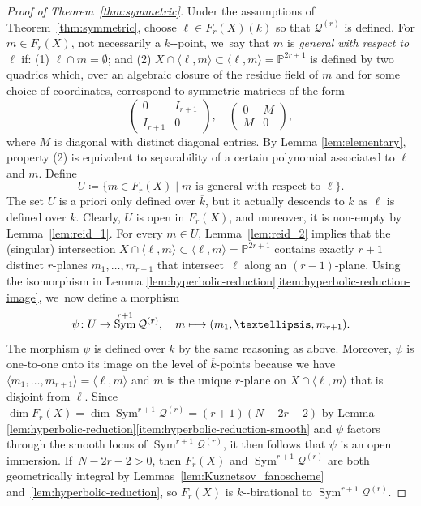 \documentclass[10pt,a4paper]{amsart}
\providecommand{\nobreakdash}{\nobreak\hbox{-}}
\newcommand\mto{\mathchoice{\longmapsto}{\mapsto}{\mapsto}{\mapsto}}
\let\bb\mathbb\let\Bbb\mathbb
\theoremstyle{plain}
\theoremstyle{definition}
\DeclareMathOperator{\Sym}{Sym}
\newcommand{\defi}[1]{\emph{#1}}
\newcommand{\kbar}{{\overline{k}}}
\renewcommand\P{\mathbb{P}}
\begin{document}
\begin{proof}[Proof of Theorem~\ref{thm:symmetric}]
Under the assumptions of Theorem~\ref{thm:symmetric}, choose $\ell\in F_r(X)(k)$ so that $\mathcal{Q}^{(r)}$ is defined.
For $m\in F_r(X)$, not necessarily a $k$\nobreakdash-point, we~say that $m$ is \defi{general with respect to $\ell$} if:
(1) $\ell\cap m=\emptyset$; and (2) $X\cap \langle \ell, m\rangle \subset \langle \ell, m\rangle = \P^{2r+1}$ is defined by two quadrics which, over an algebraic closure of the residue field of $m$ and for some choice of coordinates, correspond to symmetric matrices of the form
\[
\begin{pmatrix}
0 & I_{r+1}\\
I_{r+1} & 0
\end{pmatrix}, \quad
\begin{pmatrix}
0 & M\\
M & 0
\end{pmatrix},
\]
where $M$ is diagonal with distinct diagonal entries.
By Lemma \ref{lem:elementary},
property (2) is equivalent to separability of a certain polynomial associated to $\ell$ and $m$. Define
\[
U\coloneqq\bigl\{m \in F_r(X) \mid m \text{ is general with respect to }\ell \bigl\}.
\]
The set $U$ is a priori only defined over $\kbar$, but it actually descends to $k$ as $\ell$ is defined over $k$.
Clearly, $U$ is open in $F_r(X)$, and moreover, it is non-empty by Lemma~\ref{lem:reid_1}.
For every $m\in U$, Lemma~\ref{lem:reid_2} implies that the (singular) intersection $X\cap \langle \ell, m\rangle \subset \langle \ell,m\rangle = \bb P^{2r+1}$ contains exactly $r+1$ distinct $r$-planes $m_1,\dots, m_{r+1}$ that intersect~$\ell$ along an $(r-1)$-plane.
Using the isomorphism in Lemma \ref{lem:hyperbolic-reduction}\eqref{item:hyperbolic-reduction-image}, we~now define a morphism
\[
\psi\colon U\to \Sym^{r+1}\mathcal{Q}^{(r)},\quad
m\mto (m_1,\dots, m_{r+1}).
\]
The morphism $\psi$ is defined over $k$ by the same reasoning as above.
Moreover, $\psi$ is one-to-one onto its image on the level of $\kbar$-points
because we have $\langle m_1,\dots, m_{r+1}\rangle =\langle \ell,m\rangle$ and $m$ is the unique $r$-plane on $X\cap \langle \ell,m\rangle$ that is disjoint from $\ell$.
Since $\dim F_r(X) = \dim \Sym^{r+1}\mathcal{Q}^{(r)}=(r+1)(N-2r-2)$ by Lemma \ref{lem:hyperbolic-reduction}\eqref{item:hyperbolic-reduction-smooth}
and $\psi$ factors through the smooth locus of $\Sym^{r+1}\mathcal{Q}^{(r)}$,
it then follows that
$\psi$ is an open immersion. If~\hbox{$N-2r-2>0$}, then $F_r(X)$ and $\Sym^{r+1}\mathcal{Q}^{(r)}$ are both geometrically integral by Lemmas~\ref{lem:Kuznetsov_fanoscheme} and~\ref{lem:hyperbolic-reduction}, so $F_r(X)$ is $k$\nobreakdash-birational to $\Sym^{r+1}\mathcal{Q}^{(r)}$.


\end{proof}
\end{document}
